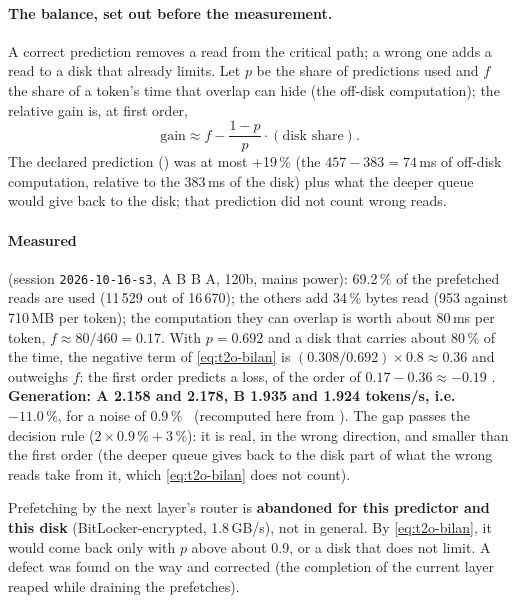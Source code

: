 \paragraph{The balance, set out before the measurement.} A correct prediction removes a read from the critical path; a wrong one adds a read to a disk that already limits. Let $p$ be the share of predictions used and $f$ the share of a token's time that overlap can hide (the off-disk computation); the relative gain is, at first order,
\begin{equation}\label{eq:t2o-bilan}
\text{gain} \approx f - \frac{1 - p}{p}\cdot(\text{disk share}).
\end{equation}
The declared prediction () was at most +19\,\% (the $457 - 383 = 74$\,ms of off-disk computation, relative to the 383\,ms of the disk) plus what the deeper queue would give back to the disk; that prediction did not count wrong reads.

\paragraph{Measured} (session \texttt{2026-10-16-s3}, A B B A, 120b, mains power): 69.2\,\% of the prefetched reads are used (11\,529 out of 16\,670); the others add 34\,\% bytes read (953 against 710\,MB per token); the computation they can overlap is worth about 80\,ms per token, $f \approx 80/460 = 0.17$. With $p = 0.692$ and a disk that carries about 80\,\% of the time, the negative term of \eqref{eq:t2o-bilan} is $(0.308/0.692) \times 0.8 \approx 0.36$ and outweighs $f$: the first order predicts a loss, of the order of $0.17 - 0.36 \approx -0.19$ \calc. \textbf{Generation: A 2.158 and 2.178, B 1.935 and 1.924 tokens/s, i.e.\ $-11.0\,\%$}, for a noise of 0.9\,\% \mes~(recomputed here from ). The gap passes the decision rule ($2 \times 0.9\,\% + 3\,\%$): it is real, in the wrong direction, and smaller than the first order (the deeper queue gives back to the disk part of what the wrong reads take from it, which \eqref{eq:t2o-bilan} does not count).

\begin{enbref}[title={What is killed, and what is not}]
Prefetching by the next layer's router is \textbf{abandoned for this predictor and this disk} (BitLocker-encrypted, 1.8\,GB/s), not in general. By \eqref{eq:t2o-bilan}, it would come back only with $p$ above about 0.9, or a disk that does not limit. A defect was found on the way and corrected (the completion of the current layer reaped while draining the prefetches).
\end{enbref}


